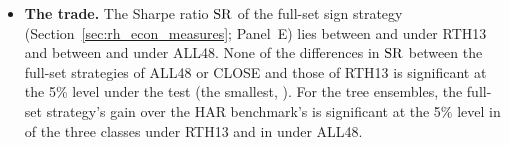 \begin{itemize}
\begin{itemize}
    ($\Delta\% = \rhtaAllThreeKVsRthThreeKBarPctMin$ to $\rhtaAllThreeKVsRthThreeKBarPctMax$, each with
    $p < 0.001$), the same pattern as at equal calendar; the two windows span about \rhtaSpanAllSmall{} and
    \rhtaSpanRthSmall{} trading days.
  \item Fewer rows also cost accuracy within the main sample: RTH13-3k has a higher loss than RTH13 at 16:00
    ($\Delta\% = \rhtaRthThreeKVsRthClosePctMin$ to $\rhtaRthThreeKVsRthClosePctMax$) and on every bar
    ($\Delta\% = \rhtaRthThreeKVsRthBarPctMin$ to $\rhtaRthThreeKVsRthBarPctMax$), each significant at the 1\% level.
  \end{itemize}
\item \textbf{The trade.} The Sharpe ratio $\mathrm{SR}$ of the full-set sign strategy (Section~\ref{sec:rh_econ_measures};
  Panel~E) lies between \rhtaShFullRthMin{} and \rhtaShFullRthMax{} under RTH13 and between \rhtaShFullAllMin{} and
  \rhtaShFullAllMax{} under ALL48. None of the \rhtaNDShTests{} differences in $\mathrm{SR}$ between the full-set strategies
  of ALL48 or CLOSE and those of RTH13 is significant at the 5\% level under the \citet{LedoitWolf2008} test (the
  smallest, \rhtaDShPMin). For the tree ensembles, the full-set strategy's gain over the HAR benchmark's is
  significant at the 5\% level in \rhtaNTreeShSigRth{} of the three classes under RTH13 and in \rhtaNTreeShSigAll{}
  under ALL48.

\end{itemize}
